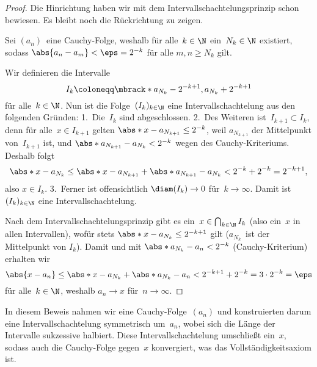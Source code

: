 \documentclass[a4paper]{article}
\begin{document}
\begin{proof}
    Die Hinrichtung haben wir mit dem Intervallschachtelungsprinzip schon bewiesen. Es bleibt noch die Rückrichtung zu zeigen.

    Sei $(a_n)$~eine Cauchy-Folge, weshalb für alle~$k \in \N$ ein~$N_k \in \N$ existiert, sodass $\abs{a_n - a_m} < \eps = 2^{-k}$ für alle $m, n \geq N_k$ gilt.

    Wir definieren die Intervalle
    \begin{equation*}
        I_k \coloneqq \mbrack*{a_{N_k} - 2^{-k+1}, a_{N_k} + 2^{-k+1}}
    \end{equation*}
    für alle~$k \in \N$. Nun ist die Folge~$(I_k)_{k\in\N}$ eine Intervallschachtelung aus den folgenden Gründen: 1.~Die~$I_k$ sind abgeschlossen. 2.~Des Weiteren ist~$I_{k+1} \subset I_k$, denn für alle~$x \in I_{k+1}$ gelten $\abs*{x - a_{N_{k+1}}} \leq 2^{-k}$, weil $a_{N_{k+1}}$ der Mittelpunkt von~$I_{k+1}$ ist, und $\abs*{a_{N_{k+1}} - a_{N_k}} < 2^{-k}$ wegen des Cauchy-Kriteriums. Deshalb folgt
    \begin{equation*}
        \abs*{x - a_{N_k}} \leq \abs*{x - a_{N_{k+1}}} + \abs*{a_{N_{k+1}} - a_{N_k}} < 2^{-k} + 2^{-k} = 2^{-k+1},
    \end{equation*}
    also $x \in I_k$. 3.~Ferner ist offensichtlich $\diam(I_k) \to 0$ für~$k \to \infty$. Damit ist~$(I_k)_{k\in\N}$ eine Intervallschachtelung.

    Nach dem Intervallschachtelungsprinzip gibt es ein~$x \in \bigcap_{k\in\N} I_k$ (also ein~$x$ in allen Intervallen), wofür stets $\abs*{x - a_{N_k}} \leq 2^{-k+1}$ gilt ($a_{N_k}$~ist der Mittelpunkt von
    $I_k$). Damit und mit $\abs*{a_{N_k}-a_n} < 2^{-k}$ (Cauchy-Kriterium) erhalten wir
    \begin{equation*}
        \abs{x - a_n} \leq \abs*{x - a_{N_k}} + \abs*{a_{N_k} - a_n} < 2^{-k+1} + 2^{-k} = 3 \cdot 2^{-k} = \eps
    \end{equation*}
    für alle~$k \in \N$, weshalb $a_n \to x$ für~$n \to \infty$.
\end{proof}

In diesem Beweis nahmen wir eine Cauchy-Folge~$(a_n)$ und konstruierten darum eine Intervallschachtelung symmetrisch um~$a_n$, wobei sich die Länge der Intervalle sukzessive halbiert. Diese Intervallschachtelung umschließt ein~$x$, sodass auch die Cauchy-Folge gegen~$x$ konvergiert, was das Vollständigkeitsaxiom ist.
\end{document}
